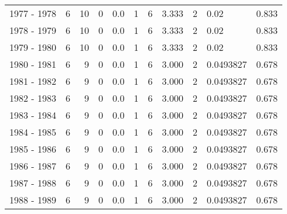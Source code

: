 \begin{tabular}{lrrrrrrrllr}
1977 - 1978 &        6 &       10 &                 0 &               0.0 &                       1 &                          6 &       3.333 &             2 &       0.02 &             0.833 \\
1978 - 1979 &        6 &       10 &                 0 &               0.0 &                       1 &                          6 &       3.333 &             2 &       0.02 &             0.833 \\
1979 - 1980 &        6 &       10 &                 0 &               0.0 &                       1 &                          6 &       3.333 &             2 &       0.02 &             0.833 \\
1980 - 1981 &        6 &        9 &                 0 &               0.0 &                       1 &                          6 &       3.000 &             2 &  0.0493827 &             0.678 \\
1981 - 1982 &        6 &        9 &                 0 &               0.0 &                       1 &                          6 &       3.000 &             2 &  0.0493827 &             0.678 \\
1982 - 1983 &        6 &        9 &                 0 &               0.0 &                       1 &                          6 &       3.000 &             2 &  0.0493827 &             0.678 \\
1983 - 1984 &        6 &        9 &                 0 &               0.0 &                       1 &                          6 &       3.000 &             2 &  0.0493827 &             0.678 \\
1984 - 1985 &        6 &        9 &                 0 &               0.0 &                       1 &                          6 &       3.000 &             2 &  0.0493827 &             0.678 \\
1985 - 1986 &        6 &        9 &                 0 &               0.0 &                       1 &                          6 &       3.000 &             2 &  0.0493827 &             0.678 \\
1986 - 1987 &        6 &        9 &                 0 &               0.0 &                       1 &                          6 &       3.000 &             2 &  0.0493827 &             0.678 \\
1987 - 1988 &        6 &        9 &                 0 &               0.0 &                       1 &                          6 &       3.000 &             2 &  0.0493827 &             0.678 \\
1988 - 1989 &        6 &        9 &                 0 &               0.0 &                       1 &                          6 &       3.000 &             2 &  0.0493827 &             0.678 \\

\end{tabular}
